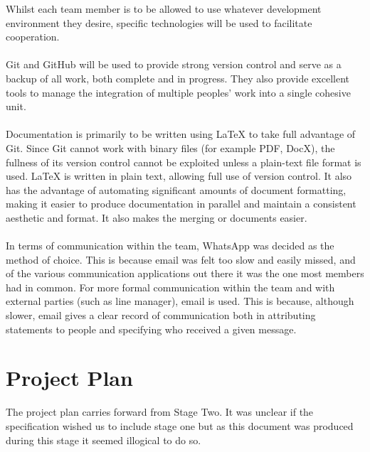 \documentclass[11pt, a4paper]{report}
\begin{document}
Whilst each team member is to be allowed to use whatever development environment they desire, specific technologies will be used to facilitate cooperation.\\
\\
Git and GitHub will be used to provide strong version control and serve as a backup of all work, both complete and in progress. They also provide excellent tools to manage the integration of multiple peoples' work into a single cohesive unit.\\
\\
Documentation is primarily to be written using LaTeX to take full advantage of Git. Since Git cannot work with binary files (for example PDF, DocX), the fullness of its version control cannot be exploited unless a plain-text file format is used. LaTeX is written in plain text, allowing full use of version control. It also has the advantage of automating significant amounts of document formatting, making it easier to produce documentation in parallel and maintain a consistent aesthetic and format. It also makes the merging or documents easier.\\
\\
In terms of communication within the team, WhatsApp was decided as the method of choice. This is because email was felt too slow and easily missed, and of the various communication applications out there it was the one most members had in common. For more formal communication within the team and with external parties (such as line manager), email is used. This is because, although slower, email gives a clear record of communication both in attributing statements to people and specifying who received a given message.

\section{Project Plan}
The project plan carries forward from Stage Two. It was unclear if the specification wished us to include stage one but as this document was produced during this stage it seemed illogical to do so. 
\end{document}

